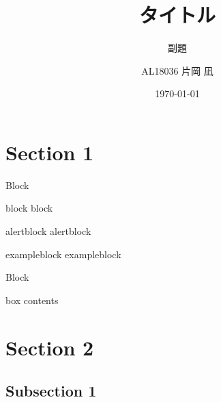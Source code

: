 \documentclass[aspectratio=169, dvipdfmx, 14pt, xcolor={svgnames,dvipsnames}]{beamer}
\title[Short title]{タイトル}
\subtitle{副題}
\author[Kataoka Nagi]{AL18036 片岡 凪}
\institute[AL18036]{芝浦工業大学 工学部 情報工学科 4年}
\date{\today}
\begin{document}

\maketitle


\section{Section 1}


\begin{frame}{Block}
  \begin{block}{block}
    block
  \end{block}
  \begin{alertblock}{alertblock}
    alertblock
  \end{alertblock}
  \begin{exampleblock}{exampleblock}
    exampleblock
  \end{exampleblock}
\end{frame}


\begin{frame}{Block}
  \begin{tcolorbox}[colframe=green,
      colback=green!10!white,
      colbacktitle=green!40!white,
      coltitle=black, fonttitle=\bfseries,
      title=My box]
    box contents
  \end{tcolorbox}
\end{frame}


\section{Section 2}


\subsection{Subsection 1}



\end{document}
